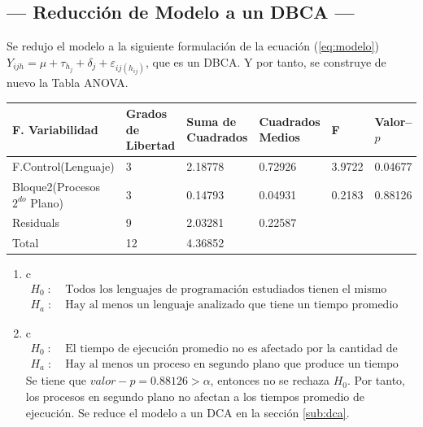 \documentclass[11pt,a4paper]{article}
\begin{document}
\subsection{--- Reducción de Modelo a un DBCA ---} %
\label{sub:dbca}
Se redujo el modelo a la siguiente formulación de la ecuación (\ref{eq:modelo}) \(Y_{ijh} = \mu + \tau _{h_{j}} + \delta _j + \varepsilon _{ij(h_{ij})}\), que es un DBCA. Y por tanto, se construye de nuevo la Tabla ANOVA.
\begin{table}[hbt!]
	\centering
	\footnotesize
	\begin{tabular}{|*{6}{l|}}
		\hline
		F. Variabilidad                   & Grados de Libertad & Suma de Cuadrados & Cuadrados Medios & F & Valor--\(p\) \\ \hline
		F.Control(Lenguaje) & 3 & 2.18778 & 0.72926  & 3.9722 & 0.04677\\ \hline
		Bloque2(Procesos \(2^{do}\) Plano)  & 3 & 0.14793 & 0.04931  & 0.2183 & 0.88126\\ \hline
		Residuals           & 9 & 2.03281 & 0.22587  &        &        \\ \hline
		Total               &12 & 4.36852 &          &        & \\ \hline
	\end{tabular}
	\label{tab:nuevo_modelo}
\end{table}
\begin{enumerate}
	\item[\fbox{Hip. Principal}] \color{white} c \color{black}
		\[
			\begin{array}{rl}
				H_0 \;:\; & \mbox{Todos los lenguajes de programación estudiados tienen el mismo tiempo de ejecución promedio.} \\
				H_a \;:\; & \mbox{Hay al menos un lenguaje analizado que tiene un tiempo promedio de ejecución diferente.}
			\end{array}
		\]
	\item[\fbox{Hip. Secundaria 2}] \color{white} c \color{black}
		\[
			\begin{array}{rl}
				H_0 \;:\; & \mbox{El tiempo de ejecución promedio no es afectado por la cantidad de procesos en segundo plano.} \\
				H_a \;:\; & \mbox{Hay al menos un proceso en segundo plano que produce un tiempo de ejecución promedio diferente.}
			\end{array}
		\]
		Se tiene que \(valor-p = 0.88126 > \alpha\), entonces no se rechaza \(H_0\).
		Por tanto, los procesos en segundo plano no afectan a los tiempos promedio de ejecución.
		Se reduce el modelo a un DCA en la sección \ref{sub:dca}.
\end{enumerate}
\end{document}
